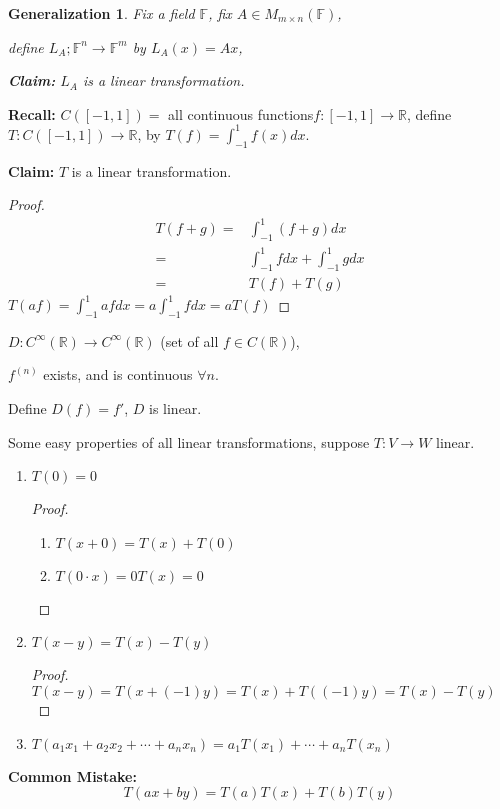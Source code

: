 \documentclass[12pt]{article}
\newtheorem{generalization}{Generalization}[subsection]
\newcommand{\mR}{{\mathbb{R}}}
\newcommand{\mF}{{\mathbb{F}}}
\begin{document}
		\begin{generalization}
			Fix a field $\mF$, fix $A \in M_{m\times n} (\mF)$, 

			define $L_A ; \mF^n \to \mF^m$  by $L_A (x) = Ax$, 

			\textbf{Claim: }$L_A$ is a linear transformation. 
		\end{generalization}

		\textbf{Recall:}
		$C([-1,1])=$ all continuous functions$ f:[-1,1] \to \mR$,
		define $T:C([-1,1]) \to \mR$, by $T(f) = \int_{-1}^1 f(x)dx$. 

		\textbf{Claim:} $T$ is a linear transformation. 
		\begin{proof}
			\begin{align*}
				T(f+g)  
				=& \int_{-1}^1 (f+g) dx\\
				=& \int_{-1}^1 f dx + \int_{-1}^1 g dx\\
				=& T(f) + T(g)
			\end{align*}
			$T(af) = \int_{-1}^1 af dx = a\int_{-1}^1 fdx = aT(f)$ 
		\end{proof}

		$D : C^{\infty}(\mR) \to C^{\infty}(\mR)$ (set of all $f\in C(\mR)$),

		$f^{(n)}$ exists, and is continuous $\forall n$. 

		Define $D(f) = f'$, $D$ is linear. 

		Some easy properties of all linear transformations, suppose 
		$T : V \to W$ linear. 
		\begin{enumerate}
			\item $T(0)=0$ 
				\begin{proof}
					\begin{enumerate}
					\item $T(x+0) = T(x) + T(0)$
					\item $T(0\cdot x) = 0T(x) = 0$
					\end{enumerate}
				\end{proof}
			\item $T(x-y) = T(x) - T(y)$
				\begin{proof}
					$T(x-y) = T(x+(-1)y) = T(x) + T((-1)y) = T(x) - T(y)$
				\end{proof}
			\item $T(a_1x_1+a_2x_2+\cdots+a_nx_n) = a_1 T(x_1) + \cdots
				+a_nT(x_n)$
		\end{enumerate}


		{\color{Gray}
		\textbf{Common Mistake:}
		\[
			T(ax+by) = T(a) T(x) + T(b)T(y)
		\]
		}
\end{document}
